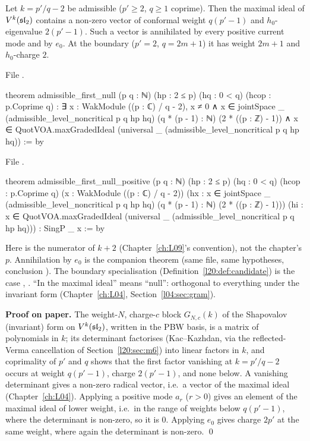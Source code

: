 \begin{theorem}\label{l20:thm:firstnull}
Let $k=p'/q-2$ be admissible ($p'\ge2$, $q\ge1$ coprime). Then the maximal ideal of $V^k(\mathfrak{sl}_2)$ contains a
non-zero vector of conformal weight $q(p'-1)$ and $h_0$-eigenvalue $2(p'-1)$. Such a vector is annihilated by
every positive current mode and by $e_0$. At the boundary ($p'=2$, $q=2m+1$) it has weight $2m+1$ and
$h_0$-charge $2$.
\end{theorem}
\noindent File .
\begin{leancode}
theorem admissible_first_null (p q : ℕ) (hp : 2 ≤ p) (hq : 0 < q)
    (hcop : p.Coprime q) :
    ∃ x : WakModule ((p : ℂ) / q - 2), x ≠ 0 ∧
      x ∈ jointSpace _ (admissible_level_noncritical p q hp hq)
        (q * (p - 1) : ℕ) (2 * ((p : ℤ) - 1)) ∧
      x ∈ QuotVOA.maxGradedIdeal
        (universal _ (admissible_level_noncritical p q hp hq)) := by
\end{leancode}
\noindent File .
\begin{leancode}
theorem admissible_first_null_positive (p q : ℕ) (hp : 2 ≤ p) (hq : 0 < q)
    (hcop : p.Coprime q)
    (x : WakModule ((p : ℂ) / q - 2))
    (hx : x ∈ jointSpace _ (admissible_level_noncritical p q hp hq)
      (q * (p - 1) : ℕ) (2 * ((p : ℤ) - 1)))
    (hi : x ∈ QuotVOA.maxGradedIdeal
      (universal _ (admissible_level_noncritical p q hp hq))) : SingP _ x := by
\end{leancode}

\begin{dictionary}
Here  is the numerator of $k+2$ (Chapter~\ref{ch:L09}'s convention), not the chapter's $p$. Annihilation by
$e_0$ is the companion theorem  (same file, same hypotheses, conclusion
). The
boundary specialisation  (Definition~\ref{l20:def:candidate}) is the case
, . ``In the maximal ideal'' means ``null'': orthogonal to everything under
the invariant form (Chapter~\ref{ch:L04}, Section~\ref{l04:sec:gram}).
\end{dictionary}

\textbf{Proof on paper.} The weight-$N$, charge-$c$ block $G_{N,c}(k)$ of the Shapovalov (invariant) form on
$V^k(\mathfrak{sl}_2)$, written in the PBW basis, is a matrix of polynomials in $k$; its determinant factorises
(Kac--Kazhdan, via the reflected-Verma cancellation of Section~\ref{l20:sec:m6}) into linear factors in $k$,
and coprimality of $p'$ and $q$ shows that the first factor vanishing at $k=p'/q-2$ occurs at weight
$q(p'-1)$, charge $2(p'-1)$, and none below. A vanishing determinant gives a non-zero radical vector, i.e.\ a
vector of the maximal ideal (Chapter~\ref{ch:L04}). Applying a positive mode $a_r$ ($r>0$) gives an element of
the maximal ideal of lower weight, i.e.\ in the range of weights below $q(p'-1)$, where the determinant is non-zero, so it is $0$.
Applying $e_0$ gives charge $2p'$ at the same weight, where again the determinant is non-zero. \qed


